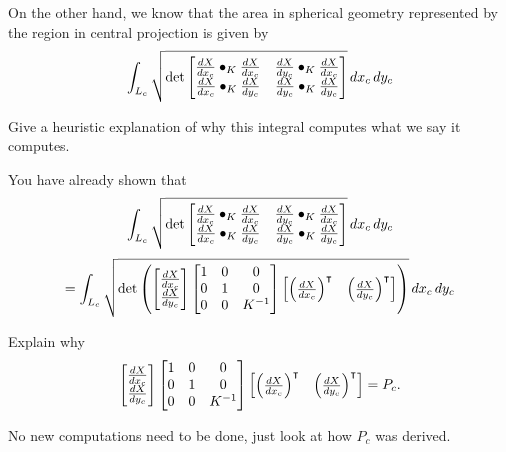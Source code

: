 \documentclass{ximera}
\begin{document}
On the other hand, we know that the area in spherical geometry
represented by the region in central projection is given by
\[
\int_{L_c} \sqrt{
  \det
  \begin{bmatrix}
    \dd[X]{x_c}\bullet_K \dd[X]{x_c} & \dd[X]{y_c}\bullet_K \dd[X]{x_c} \\
    \dd[X]{x_c}\bullet_K \dd[X]{y_c} & \dd[X]{y_c}\bullet_K \dd[X]{y_c}
  \end{bmatrix}
}\d x_c\d y_c
\]

\begin{problem}
  Give a heuristic explanation of why this integral computes what we
  say it computes.
\end{problem}

You have already shown that
\[
\int_{L_c} \sqrt{
  \det
  \begin{bmatrix}
    \dd[X]{x_c}\bullet_K \dd[X]{x_c} & \dd[X]{y_c}\bullet_K \dd[X]{x_c} \\
    \dd[X]{x_c}\bullet_K \dd[X]{y_c} & \dd[X]{y_c}\bullet_K \dd[X]{y_c}
  \end{bmatrix}
}\d x_c\d y_c
\]
\[
=
\int_{L_c} \sqrt{
  \det\left(
  \begin{bmatrix}
    \dd[X]{x_c}\\
    \dd[X]{y_c}
  \end{bmatrix}
  \begin{bmatrix}
    1 & 0 & 0\\
    0 & 1 & 0\\
    0 & 0 & K^{-1}
  \end{bmatrix}
  \begin{bmatrix}
    \left(\dd[X]{x_c}\right)^\transpose & \left(\dd[X]{y_c}\right)^\transpose
  \end{bmatrix}\right)
}\d x_c\d y_c
\]

\begin{problem}
  Explain why
  \[
\begin{bmatrix}
    \dd[X]{x_c}\\
    \dd[X]{y_c}
  \end{bmatrix}
  \begin{bmatrix}
    1 & 0 & 0\\
    0 & 1 & 0\\
    0 & 0 & K^{-1}
  \end{bmatrix}
  \begin{bmatrix}
    \left(\dd[X]{x_c}\right)^\transpose & \left(\dd[X]{y_c}\right)^\transpose
  \end{bmatrix} =P_c.
  \]
  \begin{hint}
    No new computations need to be done, just look at how $P_c$ was derived.
  \end{hint}
\end{problem}
\end{document}
